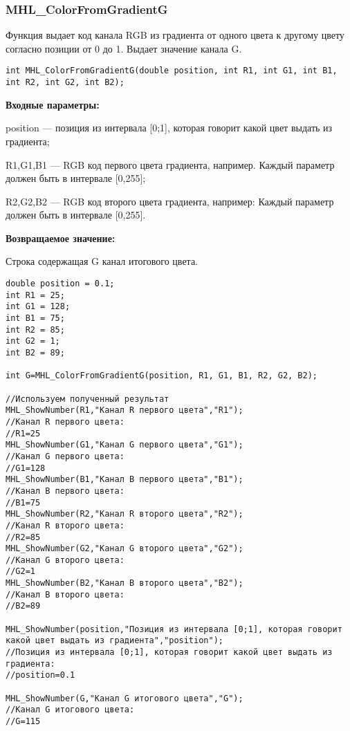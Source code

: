 \documentclass[a4paper,12pt]{article}
\begin{document}
\subsubsection{MHL\_ColorFromGradientG}\label{MHL_ColorFromGradientG}

Функция выдает код канала RGB из градиента от одного цвета к другому цвету согласно позиции от 0 до 1. Выдает значение канала G.


\begin{lstlisting}[label=code_syntax_MHL_ColorFromGradientG,caption=Синтаксис]
int MHL_ColorFromGradientG(double position, int R1, int G1, int B1, int R2, int G2, int B2);
\end{lstlisting}

\textbf{Входные параметры:}  

position --- позиция из интервала [0;1], которая говорит какой цвет выдать из градиента;
 
    R1,G1,B1 --- RGB код первого цвета градиента, например. Каждый параметр должен быть в интервале [0,255];
 
    R2,G2,B2 --- RGB код второго цвета градиента, например: Каждый параметр должен быть в интервале [0,255].

\textbf{Возвращаемое значение:}

Строка содержащая G канал итогового цвета.


\begin{lstlisting}[label=code_use_MHL_ColorFromGradientG,caption=Пример использования]
double position = 0.1;
int R1 = 25;
int G1 = 128;
int B1 = 75;
int R2 = 85;
int G2 = 1;
int B2 = 89;

int G=MHL_ColorFromGradientG(position, R1, G1, B1, R2, G2, B2);

//Используем полученный результат
MHL_ShowNumber(R1,"Канал R первого цвета","R1");
//Канал R первого цвета:
//R1=25
MHL_ShowNumber(G1,"Канал G первого цвета","G1");
//Канал G первого цвета:
//G1=128
MHL_ShowNumber(B1,"Канал B первого цвета","B1");
//Канал B первого цвета:
//B1=75
MHL_ShowNumber(R2,"Канал R второго цвета","R2");
//Канал R второго цвета:
//R2=85
MHL_ShowNumber(G2,"Канал G второго цвета","G2");
//Канал G второго цвета:
//G2=1
MHL_ShowNumber(B2,"Канал B второго цвета","B2");
//Канал B второго цвета:
//B2=89

MHL_ShowNumber(position,"Позиция из интервала [0;1], которая говорит какой цвет выдать из градиента","position");
//Позиция из интервала [0;1], которая говорит какой цвет выдать из градиента:
//position=0.1

MHL_ShowNumber(G,"Канал G итогового цвета","G");
//Канал G итогового цвета:
//G=115
\end{lstlisting}
\end{document}
